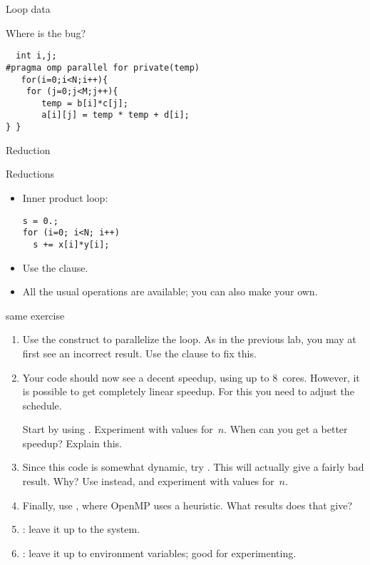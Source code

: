  {Loop data}

\begin{numberedframe}{Where is the bug?}
\begin{lstlisting}
  int i,j;
#pragma omp parallel for private(temp)
   for(i=0;i<N;i++){
    for (j=0;j<M;j++){
       temp = b[i]*c[j];
       a[i][j] = temp * temp + d[i];
} }  
\end{lstlisting}
\end{numberedframe}

 {Reduction}

\begin{numberedframe}{Reductions}
  \begin{itemize}
  \item Inner product loop:
\begin{verbatim}
s = 0.;
for (i=0; i<N; i++)
  s += x[i]*y[i];
\end{verbatim}
\item Use the  clause.
  \item All the usual operations are available; you can also make your own.
  \end{itemize}
\end{numberedframe}

\begin{exerciseframe}[piadapt]
  \footnotesize
  
\end{exerciseframe}

\begin{numberedframe}{same exercise}
  \begin{enumerate}
  \item Use the  construct to parallelize the loop.
    As in the previous lab, you may at first see an incorrect result.
    Use the  clause to fix this.
  \item Your code should now see a decent speedup, using up to 8~cores.
    However, it is possible to get completely linear speedup. For this
    you need to adjust the schedule.

    Start by using . Experiment with values
    for~$n$.  When can you get a better speedup? Explain this.
  \item Since this code is somewhat dynamic, try .
    This will actually give a fairly bad result. Why?  Use
     instead, and experiment with values
    for~$n$.
  \item Finally, use , where OpenMP uses a
    heuristic.  What results does that give?
  \item {} : leave it up to the system.
  \item {} : leave it up to environment variables;
    good for experimenting.
  \end{enumerate}
\end{numberedframe}

